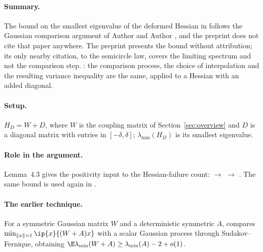 
\paragraph{Summary.}
The bound on the smallest eigenvalue of the deformed Hessian in
 follows the Gaussian comparison
argument of Author and Author , and the preprint does not cite that paper anywhere. The preprint
presents the bound without attribution; its only nearby citation, to the
semicircle law, covers the limiting spectrum and not the comparison step.
: the comparison process, the choice of interpolation and
the resulting variance inequality are the same, applied to a Hessian with an
added diagonal.

\paragraph{Setup.}
$H_D = W + D$, where $W$ is the coupling matrix of Section~\ref{sec:overview}
and $D$ is a diagonal matrix with entries in $[-\delta,\delta]$; $\lambda_{\min}(H_D)$
is its smallest eigenvalue.

\paragraph{Role in the argument.}
Lemma~4.3 gives the positivity input to the Hessian-failure count:
 $\to$ 
$\to$ . The same bound is used again in
.

\paragraph{The earlier technique.}
For a symmetric Gaussian matrix $W$ and a deterministic symmetric $A$,
 compares
$\min_{\|x\|=1}\ip{x}{(W+A)x}$ with a scalar Gaussian process through
Sudakov--Fernique, obtaining
$\E\lambda_{\min}(W+A)\ge \lambda_{\min}(A)-2+o(1)$.

